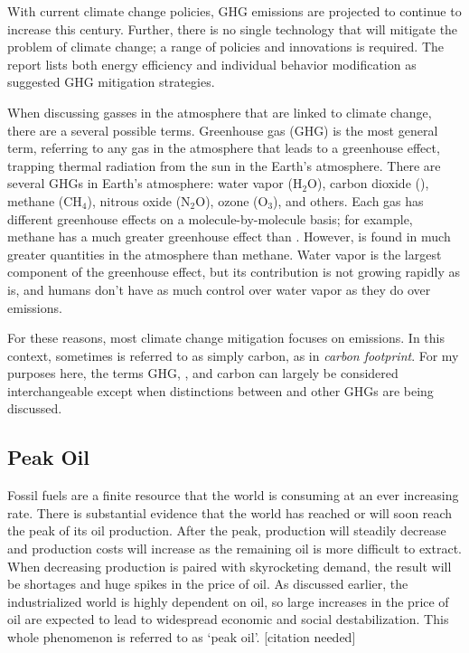 With current climate change policies, GHG emissions are projected to continue to increase this century. Further, there is no single technology that will mitigate the problem of climate change; a range of policies and innovations is required. The report lists both energy efficiency and individual behavior modification as suggested GHG mitigation strategies.

When discussing gasses in the atmosphere that are linked to climate change, there are a several possible terms. Greenhouse gas (GHG) is the most general term, referring to any gas in the atmosphere that leads to a greenhouse effect, trapping thermal radiation from the sun in the Earth's atmosphere. There are several GHGs in Earth's atmosphere: water vapor (H$_2$O), carbon dioxide (\COtwo), methane (CH$_4$), nitrous oxide (N$_2$O), ozone (O$_3$), and others. Each gas has different greenhouse effects on a molecule-by-molecule basis; for example, methane has a much greater greenhouse effect than \COtwo.  However, \COtwo is found in much greater quantities in the atmosphere than methane. Water vapor is the largest component of the greenhouse effect, but its contribution is not growing rapidly as \COtwo is, and humans don't have as much control over water vapor as they do over \COtwo emissions.

For these reasons, most climate change mitigation focuses on \COtwo emissions. In this context, sometimes \COtwo is referred to as simply carbon, as in \emph{carbon footprint}. For my purposes here, the terms GHG, \COtwo, and carbon can largely be considered interchangeable except when distinctions between \COtwo and other GHGs are being discussed.

\subsection{Peak Oil}

Fossil fuels are a finite resource that the world is consuming at an ever increasing rate. There is substantial evidence that the world has reached or will soon reach the peak of its oil production. After the peak, production will steadily decrease and production costs will increase as the remaining oil is more difficult to extract. When decreasing production is paired with skyrocketing demand, the result will be shortages and huge spikes in the price of oil. As discussed earlier, the industrialized world is highly dependent on oil, so large increases in the price of oil are expected to lead to widespread economic and social destabilization. This whole phenomenon is referred to as `peak oil'. [citation needed]

